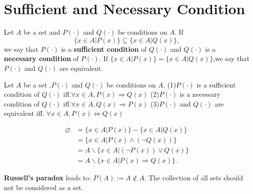 \documentclass{book}
\numberwithin{equation}{section}
\begin{document}
\section{Sufficient and Necessary Condition}
\begin{definitionenv}
    Let $A$ be a set and $P(\cdot)$ and $Q(\cdot)$ be conditions on $A$.
    If $$\{x\in A|P(x)\}\subseteq\{x\in A|Q(x)\},$$ we say that $P(\cdot)$ is a \textbf{sufficient condition} of $Q(\cdot)$ and $Q(\cdot)$ is a \textbf{necessary condition} of $P(\cdot)$. 
    If $\{x\in A|P(x)\}=\{x\in A|Q(x)\}$,we say that $P(\cdot)$ and $Q(\cdot)$ are equivalent.
\end{definitionenv}
\begin{propositionenv}
    Let $A$ be a set ,$P(\cdot)$ and $Q(\cdot)$ be conditions on $A$.
    \newline
    (1)$P(\cdot)$ is a sufficient condition of $Q(\cdot)$ iff.$\forall x\in A,P(x)\Rightarrow Q(x)$
    \newline
    (2)$P(\cdot) $ is a necessary condition of $Q(\cdot)$ iff.$\forall x\in A,Q(x)\Rightarrow P(x)$
    \newline
    (3)$P(\cdot)$ and $Q(\cdot)$ are equivalent iff. $\forall x\in A,P(x)\Leftrightarrow Q(x)$
\end{propositionenv}
\begin{proofenv}
\begin{align*}
    \varnothing&=\{x\in A|P(x)\}- \{x\in A|Q(x)\}\\
    &=\{x\in A|P(x)\wedge (\neg Q(x))\}\\
    &=A\backslash\{x\in A|(\neg P(x))\vee  Q(x)\}\\
    &=A\backslash\{x\in A |P(x)\Rightarrow Q(x)\}.
\end{align*}
\end{proofenv}
\textbf{Russell's paradox} leads to: $P(A):=A\notin A$. The collection of all sets should not be considered as a set.
\end{document}
